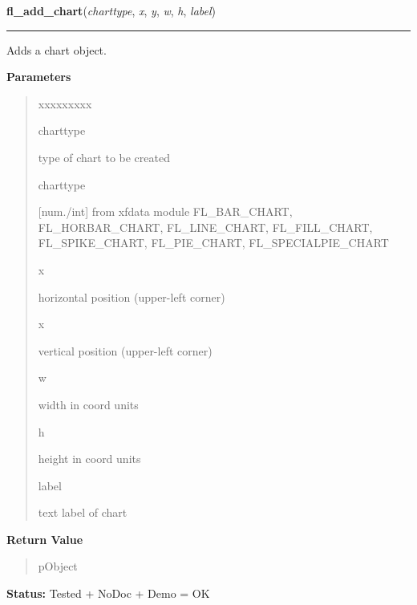 \hspace{.8\funcindent}\begin{boxedminipage}{\funcwidth}

    \raggedright \textbf{fl\_add\_chart}(\textit{charttype}, \textit{x}, \textit{y}, \textit{w}, \textit{h}, \textit{label})

    \vspace{-1.5ex}

    \rule{\textwidth}{0.5\fboxrule}
\setlength{\parskip}{2ex}
    Adds a chart object.

\setlength{\parskip}{1ex}
      \textbf{Parameters}
      \vspace{-1ex}

      \begin{quote}
        \begin{Ventry}{xxxxxxxxx}

          \item[charttype]

          type of chart to be created

          \item[charttype]

          [num./int] from xfdata module FL\_BAR\_CHART, FL\_HORBAR\_CHART, 
          FL\_LINE\_CHART, FL\_FILL\_CHART, FL\_SPIKE\_CHART, 
          FL\_PIE\_CHART, FL\_SPECIALPIE\_CHART

          \item[x]

          horizontal position (upper-left corner)

          \item[x]

          vertical position (upper-left corner)

          \item[w]

          width in coord units

          \item[h]

          height in coord units

          \item[label]

          text label of chart

        \end{Ventry}

      \end{quote}

      \textbf{Return Value}
    \vspace{-1ex}

      \begin{quote}
      pObject

      \end{quote}

\textbf{Status:} Tested + NoDoc + Demo = OK



    \end{boxedminipage}

